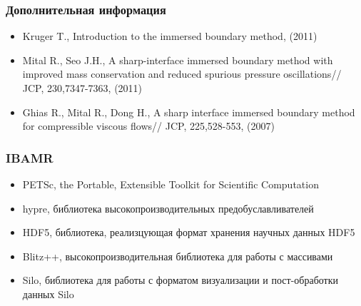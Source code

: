\documentclass[14pt]{beamer}
\begin{document}
\begin{frame}
\frametitle{Дополнительная информация}
    \begin{itemize}
        \item Kruger T., Introduction to the immersed boundary method, (2011)
        \item Mital R., Seo J.H., A sharp-interface immersed boundary method with improved mass conservation and reduced spurious pressure oscillations// JCP, 230,7347-7363, (2011)
        \item Ghias R., Mital R., Dong H., A sharp interface immersed boundary method for compressible viscous flows// JCP, 225,528-553, (2007)
    \end{itemize}
\end{frame}

\begin{frame}
\frametitle{IBAMR}
    \begin{itemize}
        \item \alert<+>{PETSc, the Portable, Extensible Toolkit for Scientific Computation}
        \item \alert<+>{hypre, библиотека высокопроизводительных предобуславливателей}
        \item \alert<+>{HDF5, библиотека, реализцующая формат хранения научных данных HDF5}
        \item \alert<+>{Blitz++, высокопроизводительная библиотека для работы с массивами}
        \item \alert<+>{Silo, библиотека для работы с форматом визуализации и пост-обработки данных Silo}
    \end{itemize}
\end{frame}
\end{document}
